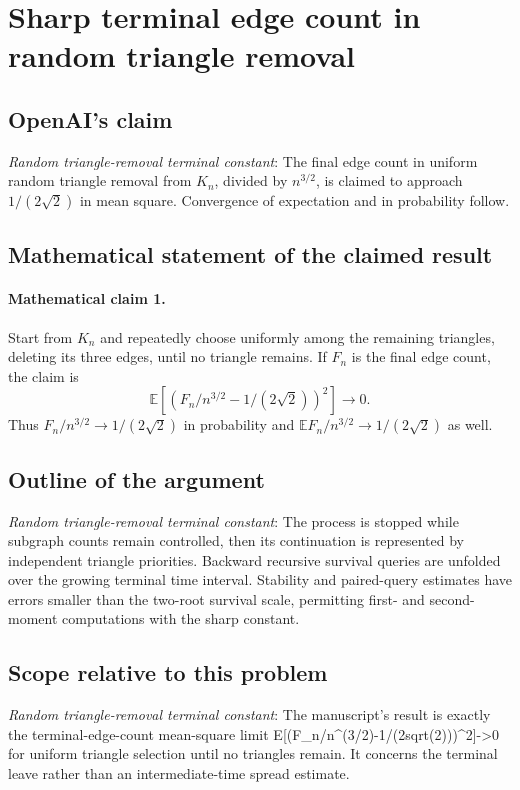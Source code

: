 \documentclass[11pt]{article}
\begin{document}
\section*{Sharp terminal edge count in random triangle removal}

\subsection{OpenAI's claim}
\textit{Random triangle-removal terminal constant}: The final edge count in uniform random triangle removal from $K_n$, divided by $n^{3/2}$, is claimed to approach $1/(2\sqrt2)$ in mean square. Convergence of expectation and in probability follow.

\subsection{Mathematical statement of the claimed result}
\paragraph{Mathematical claim 1.} Start from $K_n$ and repeatedly choose uniformly among the remaining triangles, deleting its three edges, until no triangle remains. If $F_n$ is the final edge count, the claim is \[\mathbb E\left[\left(F_n/n^{3/2}-1/(2\sqrt2)\right)^2\right]\longrightarrow0.\] Thus $F_n/n^{3/2}\to1/(2\sqrt2)$ in probability and $\mathbb EF_n/n^{3/2}\to1/(2\sqrt2)$ as well.

\subsection{Outline of the argument}
\textit{Random triangle-removal terminal constant}: The process is stopped while subgraph counts remain controlled, then its continuation is represented by independent triangle priorities. Backward recursive survival queries are unfolded over the growing terminal time interval. Stability and paired-query estimates have errors smaller than the two-root survival scale, permitting first- and second-moment computations with the sharp constant.

\subsection{Scope relative to this problem}
\textit{Random triangle-removal terminal constant}: The manuscript’s result is exactly the terminal-edge-count mean-square limit E[(F\_n/n\textasciicircum{}(3/2)-1/(2sqrt(2)))\textasciicircum{}2]->0 for uniform triangle selection until no triangles remain. It concerns the terminal leave rather than an intermediate-time spread estimate.
\end{document}
